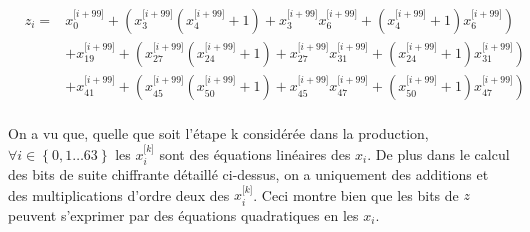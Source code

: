\begin{equation}
\begin{aligned}
  &z_i =& x^{\lbrack i + 99\rbrack}_0 + (x^{\lbrack i+99\rbrack}_{3}( x^{\lbrack i+99\rbrack}_{4} + 1) + x^{\lbrack i+99\rbrack}_{3} x^{\lbrack i+99\rbrack}_{6} + ( x^{\lbrack i+99\rbrack}_{4} + 1) x^{\lbrack i+99\rbrack}_{6}) \\  
  & &+ x^{\lbrack i + 99\rbrack}_{19} + (x^{\lbrack i+99\rbrack}_{27}(x^{\lbrack i+99\rbrack}_{24} + 1) + x^{\lbrack i+99\rbrack}_{27} x^{\lbrack i+99\rbrack}_{31} + (x^{\lbrack i+99\rbrack}_{24} + 1)x^{\lbrack i+99\rbrack}_{31}) \\  
  & &+ x^{\lbrack i + 99\rbrack}_{41} + (x^{\lbrack i+99\rbrack}_{45} (x^{\lbrack i+99\rbrack}_{50} + 1) + x^{\lbrack i+99\rbrack}_{45} x^{\lbrack i+99\rbrack}_{47} + (x^{\lbrack i+99\rbrack}_{50} + 1)x^{\lbrack i+99\rbrack}_{47}) \\
\end{aligned}
\end{equation}


On a vu que, quelle que soit l'étape k considérée dans la production, $ \forall i \in \left\{ {0,1 \ldots 63}\right\}$ les $x^{\lbrack k \rbrack}_{i}$ sont des équations linéaires des $x_i$. De plus dans le calcul des bits de suite chiffrante détaillé ci-dessus, on a uniquement des additions et des multiplications d'ordre deux des $x^{\lbrack k \rbrack}_{i}$. Ceci montre bien que les bits de $z$ peuvent s'exprimer par des équations quadratiques en les $x_i$.
